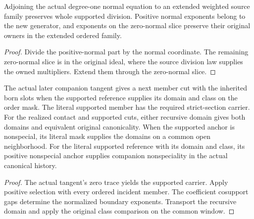 \begin{theorem}
\label{hir:g1-closed-normal-supported-division}
\leanok
Adjoining the actual degree-one normal equation to an
extended weighted source family preserves whole supported
division. Positive normal exponents belong to the new
generator, and exponents on the zero-normal slice preserve
their original owners in the extended ordered family.
\end{theorem}
\begin{proof}
Divide the positive-normal part by the normal coordinate.
The remaining zero-normal slice is in the original ideal,
where the source division law supplies the owned
multipliers. Extend them through the zero-normal slice.
\end{proof}

\begin{theorem}
\label{hir:g1-actual-born-cut-canonicality}
\leanok
The actual later companion tangent gives a next member cut
with the inherited born slots when the supported reference
supplies its domain and class on the order mask. The literal
supported member has the required strict-section carrier.
For the realized contact and supported cuts, either recursive
domain gives both domains and equivalent original canonicality.
When the supported anchor is nonspecial, its literal mask
supplies the domains on a common open neighborhood.
For the literal supported reference with its domain and
class, its positive nonspecial anchor supplies companion
nonspeciality in the actual canonical history.
\end{theorem}
\begin{proof}
The actual tangent's zero trace yields the supported carrier.
Apply positive selection with every ordered incident member.
The coefficient cosupport gaps determine the normalized
boundary exponents. Transport the recursive domain and apply
the original class comparison on the common window.
\end{proof}


